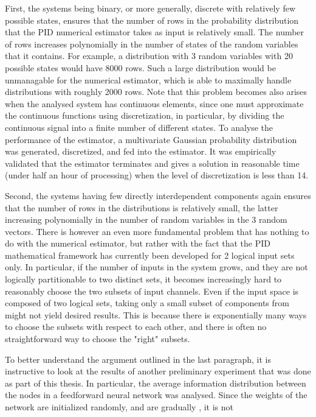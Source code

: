 \documentclass[12pt]{article}
\begin{document}
First, the systems being binary, or more generally, discrete with relatively few possible states, ensures that the number of rows in the probability distribution that the PID numerical estimator takes as input is relatively small. The number of rows  increases polynomially in the number of states of the random variables that it contains. For example, a distribution with 3 random variables with 20 possible states would have 8000 rows. Such a large distribution would be unmanagable for the numerical estimator, which is able to maximally handle distributions with roughly 2000 rows. Note that this problem becomes also arises when the analysed system has continuous elements, since one must approximate the continuous functions using discretization, in particular, by dividing the continuous signal into a finite number of different states. To analyse the performance of the estimator, a multivariate Gaussian probability distribution was generated, discretized, and fed into the estimator. It was empirically validated that the estimator terminates and gives a solution in reasonable time (under half an hour of processing) when the level of discretization is less than 14.   

Second, the systems having few directly interdependent components again ensures that the number of rows in the distributions is relatively small, the latter increasing polynomially in the number of random variables in the 3 random vectors. There is however an even more fundamental problem that has nothing to do with the numerical estimator, but rather with the fact that the PID mathematical framework has currently been developed for 2 logical input sets only. In particular, if the number of inputs in the system grows, and they are not logically partitionable to two distinct sets, it becomes increasingly hard to reasonably choose the two subsets of input channels. Even if the input space is composed of two logical sets, taking only a small subset of components from might not yield desired results. This is because  there is exponentially many ways to choose the subsets with respect to each other, and there is often no straightforward way to choose the "right" subsets. 

To better understand the argument outlined in the last paragraph, it is instructive to look at the results of another preliminary experiment that was done as part of this thesis. In particular, the average information distribution between the nodes in a feedforward neural network was analysed. Since the weights of the network are initialized randomly, and are gradually , it is not 
\end{document}
